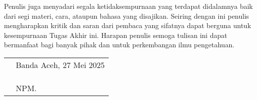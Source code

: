 Penulis juga menyadari segala ketidaksempurnaan yang terdapat didalamnya baik dari segi materi, cara, ataupun bahasa yang disajikan. Seiring dengan ini penulis mengharapkan kritik dan saran dari pembaca yang sifatnya dapat berguna untuk kesempurnaan Tugas Akhir ini. Harapan penulis semoga tulisan ini dapat bermanfaat bagi banyak pihak dan untuk perkembangan ilmu pengetahuan.

\vspace{1cm}


\begin{tabular}{p{7.5cm}l}
	&Banda Aceh, 27 Mei 2025\\
	&\\
	&\\
	&\multirow{1.5}{7.5cm}{\underline{\@fullname}} \\ 
	&NPM. \@idnum \\
\end{tabular}
\makeatother